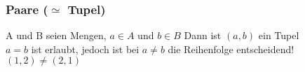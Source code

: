 \documentclass{beamer}
\begin{document}
	\begin{frame}
		\frametitle{Paare ($\simeq$ Tupel)}
		A und B seien Mengen, $a\in A$ und $b\in B$
		Dann ist $(a,b)$ ein Tupel\\
		$a = b$ ist erlaubt, jedoch ist bei $ a\neq b$ die Reihenfolge entscheidend! $(1, 2) \neq (2, 1)$
	\end{frame}
\end{document}
